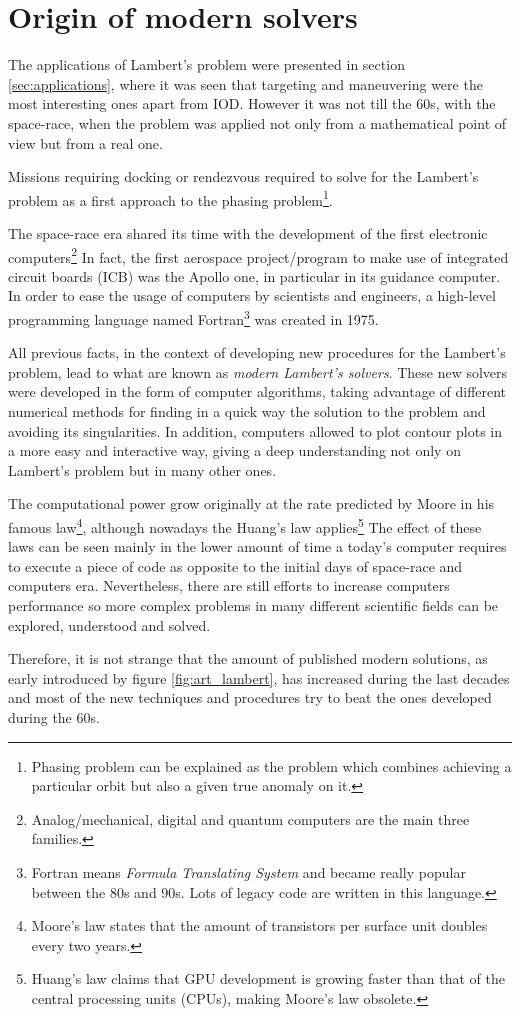 \section{Origin of modern solvers}

The applications of Lambert's problem were presented in section
\ref{sec:applications}, where it was seen that targeting and maneuvering were
the most interesting ones apart from IOD. However it was not till the 60s, with
the space-race, when the problem was applied not only from a mathematical point
of view but from a real one.

Missions requiring docking or rendezvous required to solve for the Lambert's
problem as a first approach to the phasing problem\footnote{Phasing problem can
  be explained as the problem which combines achieving a particular orbit but also
  a given true anomaly on it.}.

The space-race era shared its time with the development of the first electronic
computers\footnote{Analog/mechanical, digital and quantum computers are the main
  three families.} In fact, the first aerospace project/program to make use of
integrated circuit boards (ICB) was the Apollo one, in particular in its
guidance computer. In order to ease the usage of computers by scientists and
engineers, a high-level programming language named Fortran\footnote{Fortran
  means \textit{Formula Translating System} and became really popular
  between the 80s and 90s. Lots of legacy code are written in this
  language.} was created in 1975.

All previous facts, in the context of developing new procedures for the
Lambert's problem, lead to what are known as \textit{modern Lambert's solvers}.
These new solvers were developed in the form of computer algorithms, taking
advantage of different numerical methods for finding in a quick way the
solution to the problem and avoiding its singularities. In addition, computers
allowed to plot contour plots in a more easy and interactive way, giving a deep
understanding not only on Lambert's problem but in many other ones.

The computational power grow originally at the rate predicted by Moore in his
famous law\footnote{Moore's law states that the amount of transistors per
  surface unit doubles every two years.}, although nowadays the Huang's
law applies\footnote{Huang's law claims that GPU development is growing
  faster than that of the central processing units (CPUs), making Moore's
  law obsolete.} The effect of these laws can be seen mainly in the lower amount
of time a today's computer requires to execute a piece of code as opposite to
the initial days of space-race and computers era. Nevertheless, there are still
efforts to increase computers performance so more complex problems in many
different scientific fields can be explored, understood and solved.

Therefore, it is not strange that the amount of published modern solutions, as
early introduced by figure \ref{fig:art_lambert}, has increased during the last
decades and most of the new techniques and procedures try to beat the ones
developed during the 60s.

